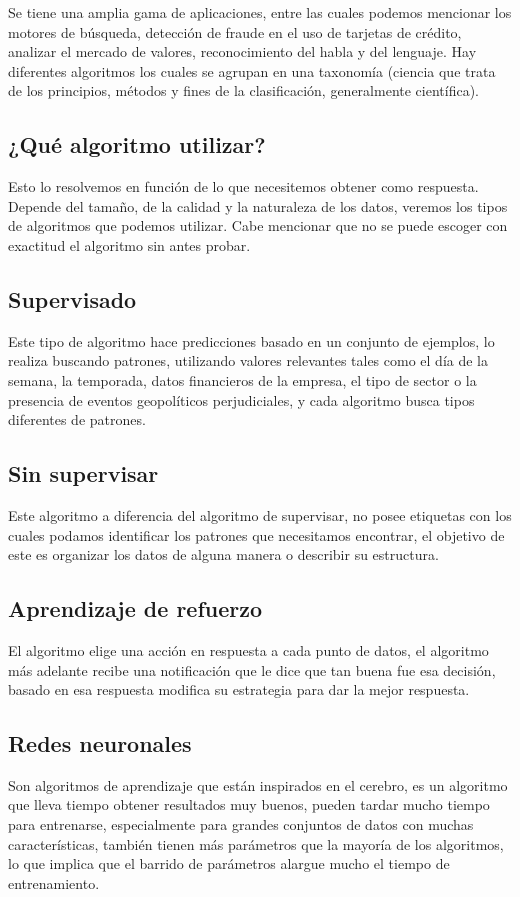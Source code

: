 \documentclass[a4paper,openright,11pt]{article}
\begin{document}
Se tiene una amplia gama de aplicaciones, entre las cuales podemos mencionar los motores de búsqueda, detección de fraude en el uso de tarjetas de crédito, analizar el mercado de valores, reconocimiento del habla y del lenguaje. Hay diferentes algoritmos los cuales se agrupan en una taxonomía (ciencia que trata de los principios, métodos y fines de la clasificación, generalmente científica).

\subsection{¿Qué algoritmo utilizar?}
Esto lo resolvemos en función de lo que necesitemos obtener como respuesta. Depende del tamaño, de la calidad y la naturaleza de los datos, veremos los tipos de algoritmos que podemos utilizar. Cabe mencionar que no se puede escoger con exactitud el algoritmo sin antes probar.

\subsection{Supervisado}
Este tipo de algoritmo hace predicciones basado en un conjunto de ejemplos, lo realiza buscando patrones, utilizando valores relevantes tales como el día de la semana, la temporada, datos financieros de la empresa, el tipo de sector o la presencia de eventos geopolíticos perjudiciales, y cada algoritmo busca tipos diferentes de patrones. 

\subsection{Sin supervisar}
Este algoritmo a diferencia del algoritmo de supervisar, no posee etiquetas con los cuales podamos identificar los patrones que necesitamos encontrar, el objetivo de este es organizar los datos de alguna manera o describir su estructura.

\subsection{Aprendizaje de refuerzo}
El algoritmo elige una acción en respuesta a cada punto de datos, el algoritmo más adelante recibe una notificación que le dice que tan buena fue esa decisión, basado en esa respuesta modifica su estrategia para dar la mejor respuesta. 

\subsection{Redes neuronales}
Son algoritmos de aprendizaje que están inspirados en el cerebro, es un algoritmo que lleva tiempo obtener resultados muy buenos,  pueden tardar mucho tiempo para entrenarse, especialmente para grandes conjuntos de datos con muchas características, también tienen más parámetros que la mayoría de los algoritmos, lo que implica que el barrido de parámetros alargue mucho el tiempo de entrenamiento. 


\pagestyle{fancy}
\end{document}

